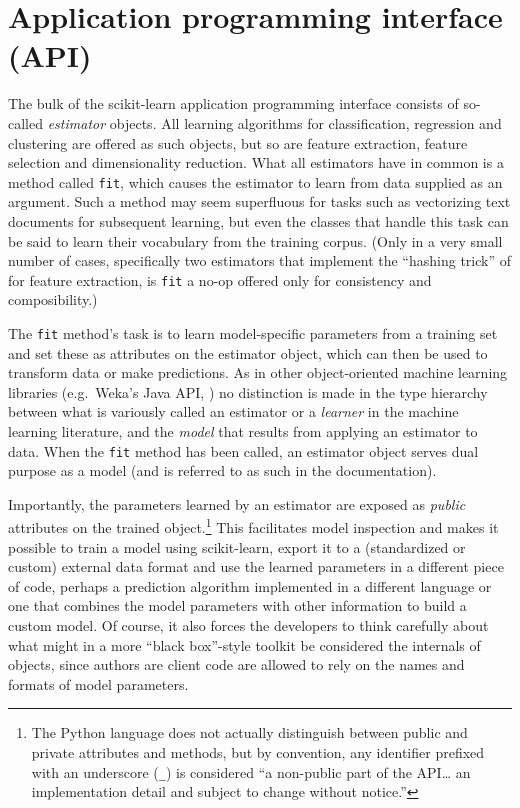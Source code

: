 \section{Application programming interface (API)}

The bulk of the scikit-learn application programming interface
consists of so-called \textit{estimator} objects.
All learning algorithms for classification, regression and clustering
are offered as such objects,
but so are feature extraction, feature selection and dimensionality reduction.
What all estimators have in common is a method called \texttt{fit},
which causes the estimator to learn from data supplied as an argument.
Such a method may seem superfluous for tasks such as vectorizing text documents
for subsequent learning,
but even the classes that handle this task can be said
to learn their vocabulary from the training corpus.
(Only in a very small number of cases,
specifically two estimators that implement the ``hashing trick'' of
\citealt{weinberger2009} for feature extraction,
is \texttt{fit} a no-op offered only for consistency and composibility.)

The \texttt{fit} method's task is to learn model-specific parameters
from a training set and set these as attributes on the estimator object,
which can then be used to transform data or make predictions.
As in other object-oriented machine learning libraries
(e.g.\ Weka's Java API, \citealp{hall2009weka})
no distinction is made in the type hierarchy
between what is variously called an estimator or a \textit{learner}
in the machine learning literature,
and the \textit{model} that results from applying an estimator to data.
When the \texttt{fit} method has been called,
an estimator object serves dual purpose as a model
(and is referred to as such in the documentation).

Importantly, the parameters learned by an estimator
are exposed as \textit{public} attributes on the trained object.\footnote{
  The Python language does not actually distinguish between public and private
  attributes and methods,
  but by convention, any identifier prefixed with an underscore (\texttt{\_})
  is considered ``a non-public part of the API\ldots
  an implementation detail and subject to change without notice.''}
This facilitates model inspection
and makes it possible to train a model using scikit-learn,
export it to a (standardized or custom) external data format
and use the learned parameters in a different piece of code,
perhaps a prediction algorithm implemented in a different language
or one that combines the model parameters with other information
to build a custom model.
Of course, it also forces the developers to think carefully
about what might in a more ``black box''-style toolkit
be considered the internals of objects,
since authors are client code are allowed to rely
on the names and formats of model parameters.

